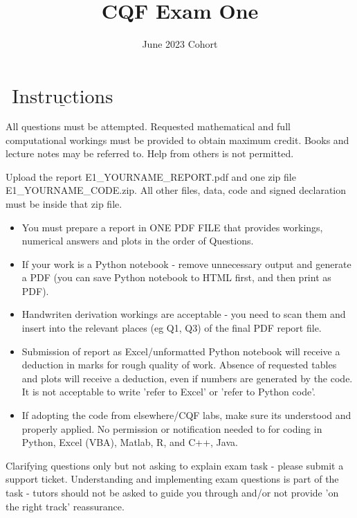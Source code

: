 \documentclass[10pt]{article}
\title{CQF Exam One }
\author{June 2023 Cohort}
\date{}
\begin{document}
\maketitle


\section*{$\underline{\text { Instructions }}$}
All questions must be attempted. Requested mathematical and full computational workings must be provided to obtain maximum credit. Books and lecture notes may be referred to. Help from others is not permitted.

Upload the report E1\_YOURNAME\_REPORT.pdf and one zip file E1\_YOURNAME\_CODE.zip. All other files, data, code and signed declaration must be inside that zip file.

\begin{itemize}
  \item You must prepare a report in ONE PDF FILE that provides workings, numerical answers and plots in the order of Questions.

  \item If your work is a Python notebook - remove unnecessary output and generate a PDF (you can save Python notebook to HTML first, and then print as PDF).

  \item Handwriten derivation workings are acceptable - you need to scan them and insert into the relevant places (eg Q1, Q3) of the final PDF report file.

  \item Submission of report as Excel/unformatted Python notebook will receive a deduction in marks for rough quality of work. Absence of requested tables and plots will receive a deduction, even if numbers are generated by the code. It is not acceptable to write 'refer to Excel' or 'refer to Python code'.

  \item If adopting the code from elsewhere/CQF labs, make sure its understood and properly applied. No permission or notification needed to for coding in Python, Excel (VBA), Matlab, R, and C++, Java.

\end{itemize}

Clarifying questions only but not asking to explain exam task - please submit a support ticket. Understanding and implementing exam questions is part of the task - tutors should not be asked to guide you through and/or not provide 'on the right track' reassurance.
\end{document}
